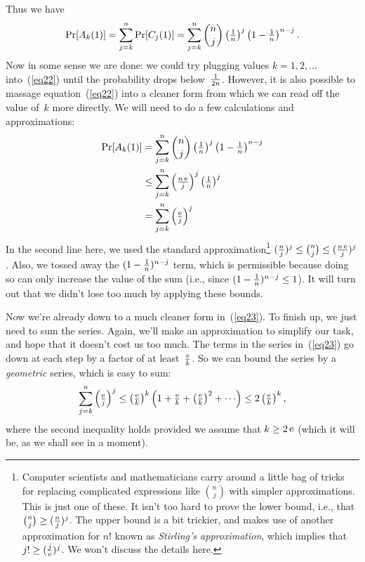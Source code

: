 \documentclass[11pt]{article}
\begin{document}
Thus we have 
\begin{equation}\label{eq22}
   \Pr[A_k(1)] = \sum_{j=k}^n \Pr[C_j(1)] 
                 = \sum_{j=k}^n{n\choose j} \left({\textstyle{1\over n}}\right)^j\left({\textstyle 1-{1\over n}}\right)^{n-j}.
\end{equation}
Now in some sense we are done: we could try plugging values $k=1,2,\ldots$
into~(\ref{eq22}) until the probability drops below~$1\over{2n}$.  However,
it is also possible to massage equation~(\ref{eq22}) into a cleaner form from which we can 
read off the value of~$k$ more directly. We will need to
do a few calculations and approximations:
\begin{align}
\Pr[A_k(1)] &= \sum_{j=k}^n{n\choose j} \left({\textstyle{1\over n}}\right)^j\left({\textstyle 1-{1\over n}}\right)^{n-j}\nonumber\\
              &\le \sum_{j=k}^n \left({\textstyle{{n\mathop{\mathrm{e}}\nolimits}\over j}}\right)^j\left({\textstyle{1\over n}}\right)^j\nonumber\\
              &= \sum_{j=k}^n \left({\textstyle{{\mathop{\mathrm{e}}\nolimits}\over j}}\right)^j\label{eq23}
\end{align}
In the second line here, we used the standard approximation\footnote{Computer
scientists and mathematicians carry around a little bag of tricks for
replacing complicated expressions like ${n\choose j}$ with simpler
approximations.  This is just one of these.  It isn't too hard to
prove the lower bound, i.e., that ${n\choose j}\ge({n\over j})^j$.
The upper bound is a bit trickier, and makes use of another approximation
for $n!$ known as {\it Stirling's approximation}, which implies that
$j!\ge ({j\over\mathop{\mathrm{e}}\nolimits})^j$.  We won't discuss the details here.}
$({n\over j})^j\le{n\choose j}\le ({{n\mathop{\mathrm{e}}\nolimits}\over j})^j$.
Also, we tossed away the $(1-{1\over n})^{n-j}$ term,
which is permissible because doing so can only increase the
value of the sum (i.e., since $(1-{1\over n})^{n-j} \le 1$).
It will turn out
that we didn't lose too much by applying these bounds.

Now we're already down to a much cleaner form in~(\ref{eq23}).
To finish up, we just need to sum the series.  Again, we'll make an
approximation to simplify our task, and hope that it doesn't cost
us too much.  The terms in the series in~(\ref{eq23}) go down at
each step by a factor of at least~${\mathop{\mathrm{e}}\nolimits\over k}$.  So we
can bound the series by a {\it geometric\/} series, which is
easy to sum:
\begin{equation}\label{eq24}
     \sum_{j=k}^n \left({\textstyle{{\mathop{\mathrm{e}}\nolimits}\over j}}\right)^j
            \le\left({\textstyle{\mathop{\mathrm{e}}\nolimits\over k}}\right)^k
                \left({\textstyle 1+{\mathop{\mathrm{e}}\nolimits\over k}+\left({\mathop{\mathrm{e}}\nolimits\over k}\right)^2+\cdots}\right)
            \le 2\left({\textstyle{\mathop{\mathrm{e}}\nolimits\over k}}\right)^k,
\end{equation}
where the second inequality holds provided we assume that $k\ge 2\mathop{\mathrm{e}}\nolimits$
(which it will be, as we shall see in a moment).
\end{document}
